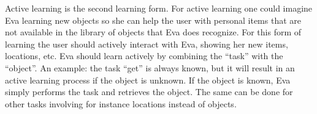\documentclass[project_eva.tex]{subfiles}
\begin{document}
\label{sec:Concept}
Active learning is the second learning form. For active learning one could imagine Eva learning new objects so 
she can help the user with personal items that are not available in the library of objects that Eva does recognize. 
For this form of learning the user should actively interact with Eva, showing her new items, locations, etc. Eva should 
learn actively by combining the ``task'' with the ``object''. An example: the task ``get''  is always known, but it will 
result in an active learning process if the object is unknown. If the object is known, Eva simply performs the task and 
retrieves the object. The same can be done for other tasks involving for instance locations instead of objects.
\end{document}
